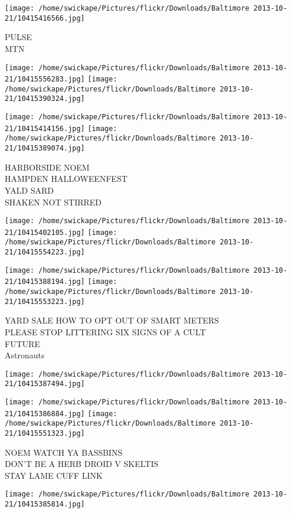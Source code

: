 \documentclass[10pt,letterpaper]{article}
\begin{document}
\vspace{0.25in}
\texttt{[image: /home/swickape/Pictures/flickr/Downloads/Baltimore 2013-10-21/10415416566.jpg]}

PULSE\\
MTN
\pagebreak

\texttt{[image: /home/swickape/Pictures/flickr/Downloads/Baltimore 2013-10-21/10415556283.jpg]}
\texttt{[image: /home/swickape/Pictures/flickr/Downloads/Baltimore 2013-10-21/10415390324.jpg]}

\texttt{[image: /home/swickape/Pictures/flickr/Downloads/Baltimore 2013-10-21/10415414156.jpg]}
\texttt{[image: /home/swickape/Pictures/flickr/Downloads/Baltimore 2013-10-21/10415389074.jpg]}

HARBORSIDE NOEM\\
HAMPDEN HALLOWEENFEST\\
YALD SARD\\
SHAKEN NOT STIRRED
\pagebreak

\texttt{[image: /home/swickape/Pictures/flickr/Downloads/Baltimore 2013-10-21/10415402105.jpg]}
\texttt{[image: /home/swickape/Pictures/flickr/Downloads/Baltimore 2013-10-21/10415554223.jpg]}

\texttt{[image: /home/swickape/Pictures/flickr/Downloads/Baltimore 2013-10-21/10415388194.jpg]}
\texttt{[image: /home/swickape/Pictures/flickr/Downloads/Baltimore 2013-10-21/10415553223.jpg]}

YARD SALE HOW TO OPT OUT OF SMART METERS\\
PLEASE STOP LITTERING SIX SIGNS OF A CULT\\
FUTURE\\
Astronauts
\pagebreak

\texttt{[image: /home/swickape/Pictures/flickr/Downloads/Baltimore 2013-10-21/10415387494.jpg]}

\vspace{0.25in}
\texttt{[image: /home/swickape/Pictures/flickr/Downloads/Baltimore 2013-10-21/10415386884.jpg]}
\texttt{[image: /home/swickape/Pictures/flickr/Downloads/Baltimore 2013-10-21/10415551323.jpg]}

NOEM WATCH YA BASSBINS\\
DON'T BE A HERB DROID V SKELTIS\\
STAY LAME CUFF LINK
\pagebreak

\texttt{[image: /home/swickape/Pictures/flickr/Downloads/Baltimore 2013-10-21/10415385814.jpg]}
\end{document}
